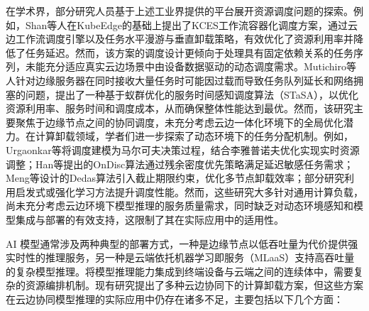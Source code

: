 在学术界，部分研究人员基于上述工业界提供的平台展开资源调度问题的探索。例如，Shan等人\cite{shan2024kces}在KubeEdge的基础上提出了KCES工作流容器化调度方案，通过云边工作流调度引擎以及任务水平漫游与垂直卸载策略，有效优化了资源利用率并降低了任务延迟。然而，该方案的调度设计更倾向于处理具有固定依赖关系的任务序列，未能充分适应真实云边场景中由设备数据驱动的动态调度需求。Mutichiro等人\cite{mutichiro2021qos}针对边缘服务器在同时接收大量任务时可能因过载而导致任务队列延长和网络拥塞的问题，提出了一种基于蚁群优化的服务时间感知调度算法（STaSA），以优化资源利用率、服务时间和调度成本，从而确保整体性能达到最优。然而，该研究主要聚焦于边缘节点之间的协同调度，未充分考虑云边一体化环境下的全局优化潜力。在计算卸载领域，学者们进一步探索了动态环境下的任务分配机制。例如，Urgaonkar等\cite{urgaonkar2015dynamic}将调度建模为马尔可夫决策过程，结合李雅普诺夫优化实现实时资源调整；Han等\cite{han2019ondisc}提出的OnDisc算法通过残余密度优先策略满足延迟敏感任务需求；Meng等\cite{meng2019online}设计的Dedas算法引入截止期限约束，优化多节点卸载效率；部分研究\cite{崔玉亚2021一种面向移动边缘计算的多用户细粒度任务卸载调度方法,邝祝芳2022基于深度强化学习的多用户边缘计算任务卸载调度与资源分配算法,郑守建2022一种基于综合匹配度的边缘计算系统任务调度方法,张斐斐2023边缘计算中协作计算卸载与动态任务调度}利用启发式或强化学习方法提升调度性能。然而，这些研究大多针对通用计算负载，尚未充分考虑云边环境下模型推理的服务质量需求，同时缺乏对动态环境感知和模型集成与部署的有效支持，这限制了其在实际应用中的适用性。

AI 模型通常涉及两种典型的部署方式，一种是边缘节点以低吞吐量为代价提供强实时性的推理服务，另一种是云端依托机器学习即服务（MLaaS）支持高吞吐量的复杂模型推理\cite{salem2023toward}。将模型推理能力集成到终端设备与云端之间的连续体中，需要复杂的资源编排机制。现有研究提出了多种云边协同下的计算卸载方案，但这些方案在云边协同模型推理的实际应用中仍存在诸多不足，主要包括以下几个方面：

